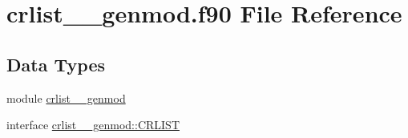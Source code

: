 \hypertarget{crlist____genmod_8f90}{\section{crlist\+\_\+\+\_\+genmod.\+f90 File Reference}
\label{crlist____genmod_8f90}
}
\subsection*{Data Types}
\begin{DoxyCompactItemize}
\item 
module \hyperlink{classcrlist____genmod}{crlist\+\_\+\+\_\+genmod}
\item 
interface \hyperlink{interfacecrlist____genmod_1_1CRLIST}{crlist\+\_\+\+\_\+genmod\+::\+C\+R\+L\+I\+S\+T}
\end{DoxyCompactItemize}
